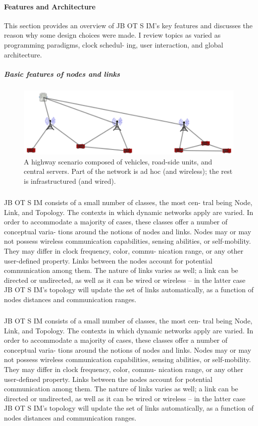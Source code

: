\paragraph{Features and Architecture}This section provides an overview of JB OT S IM’s key features and discusses the reason why some design choices were made. I review topics as varied as programming paradigms, clock schedul- ing, user interaction, and global architecture.
\newpage
\subparagraph{Basic features of nodes and links} 
\begin{figure}[h!]
	\centering
	\includegraphics[width=0.7\linewidth]{fig_2}
	\caption[A highway scenario composed of vehicles, road-side units, and central servers. Part of the network is ad hoc (and wireless); the rest is infrastructured (and wired).]{A highway scenario composed of vehicles, road-side units, and central servers. Part of the network is ad hoc (and wireless); the rest is infrastructured (and wired).}
	\label{fig:fig2}
\end{figure}
\subparagraph{}JB OT S IM consists of a small number of classes, the most cen- tral being Node, Link, and Topology. The contexts in which dynamic networks apply are varied. In order to accommodate a majority of cases, these classes offer a number of conceptual varia- tions around the notions of nodes and links. Nodes may or may not possess wireless communication capabilities, sensing abilities, or self-mobility. They may differ in clock frequency, color, commu- nication range, or any other user-defined property. Links between the nodes account for potential communication among them. The nature of links varies as well; a link can be directed or undirected, as well as it can be wired or wireless – in the latter case JB OT S IM’s topology will update the set of links automatically, as a function of nodes distances and communication ranges.
\subparagraph{}JB OT S IM consists of a small number of classes, the most cen- tral being Node, Link, and Topology. The contexts in which dynamic networks apply are varied. In order to accommodate a majority of cases, these classes offer a number of conceptual varia- tions around the notions of nodes and links. Nodes may or may not possess wireless communication capabilities, sensing abilities, or self-mobility. They may differ in clock frequency, color, commu- nication range, or any other user-defined property. Links between the nodes account for potential communication among them. The nature of links varies as well; a link can be directed or undirected, as well as it can be wired or wireless – in the latter case JB OT S IM’s topology will update the set of links automatically, as a function of nodes distances and communication ranges.
